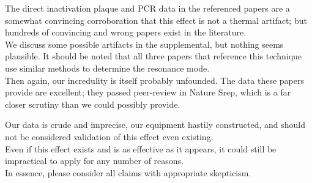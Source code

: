 \documentclass[paper.tex]{subfiles}
\begin{document}
\begin{autem}
\begin{quote}
\end{quote}

The direct inactivation plaque and PCR data in the referenced papers are a somewhat convincing corroboration that this effect is not a thermal artifact; but hundreds of convincing and wrong papers exist in the literature.\\

We discuss some possible artifacts in the supplemental, but nothing seems plausible. It should be noted that all three papers that reference this technique use similar methods to determine the resonance mode.\\

Then again, our incredulity is itself probably unfounded. The data these papers provide are excellent; they passed peer-review in Nature Srep, which is a far closer scrutiny than we could possibly provide.

Our data is crude and imprecise, our equipment hastily constructed, and should not be considered validation of this effect even existing. \\

Even if this effect exists and is as effective as it appears, it could still be impractical to apply for any number of reasons.\\


In essence, please consider all claims with appropriate skepticism.

\end{autem}
\end{document}
